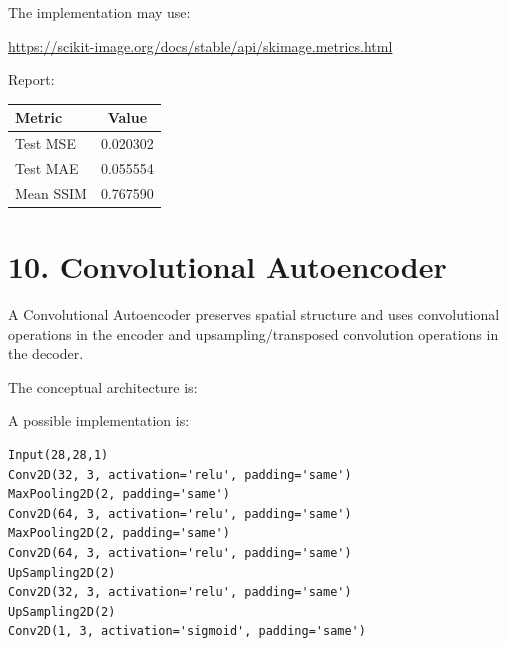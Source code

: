 \documentclass[10pt]{article}
\begin{document}
The implementation may use:

\url{https://scikit-image.org/docs/stable/api/skimage.metrics.html}

Report:

\begin{center}
\begin{tabular}{|l|c|}
\hline
Metric & Value\\
\hline
Test MSE & 0.020302\\
Test MAE & 0.055554\\
Mean SSIM & 0.767590
\\
\hline
\end{tabular}
\end{center}

\section*{10. Convolutional Autoencoder}

A Convolutional Autoencoder preserves spatial structure and uses convolutional
operations in the encoder and upsampling/transposed convolution operations
in the decoder.

The conceptual architecture is:

\begin{center}
\end{center}

A possible implementation is:

\begin{verbatim}
Input(28,28,1)
Conv2D(32, 3, activation='relu', padding='same')
MaxPooling2D(2, padding='same')
Conv2D(64, 3, activation='relu', padding='same')
MaxPooling2D(2, padding='same')
Conv2D(64, 3, activation='relu', padding='same')
UpSampling2D(2)
Conv2D(32, 3, activation='relu', padding='same')
UpSampling2D(2)
Conv2D(1, 3, activation='sigmoid', padding='same')
\end{verbatim}
\end{document}
